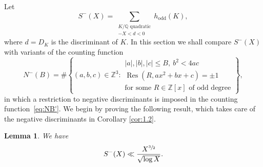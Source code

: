 \documentclass[11pt]{article}
\DeclareMathOperator{\Res}{Res}
\newcommand{\QQ}{\mathbb{Q}}\let\Q\QQ
\newcommand{\ZZ}{\mathbb{Z}}\let\Z\ZZ
\newtheorem{lemma}[theorem]{Lemma}
\numberwithin{equation}{section}
\begin{document}
Let
\[
S^-(X)=
\sum_{
\substack{K/\QQ \text{ quadratic}\\
-X<d<0
}} h_\text{odd}(K),
\]
where $d=D_K$ is the discriminant of $K$.
In this section we shall compare
$S^-(X)$ with variants of the counting function
\begin{equation}\label{eq:NB-}
N^-(B)=\#\left\{(a,b,c)\in \ZZ^3:
\begin{array}{l}
|a|,|b|,|c|\leq B, ~b^2<4ac\\
\Res(R,ax^2+bx+c)=\pm 1\\
\text{for some $R\in \ZZ[x]$ of odd degree}
\end{array}
\right\}\!,
\end{equation}
in which a restriction to negative discriminants is imposed in the counting function~\eqref{eq:NB'}.
We begin by proving the following result, which takes care of the negative discriminants in Corollary
\ref{cor:1.2}.

\begin{lemma}\label{lem:plant}
We have
\[
S^-(X)\ll \frac{X^{\sfrac{3}{2}}}{\sqrt{\log X}}.
\]
\end{lemma}
\end{document}
